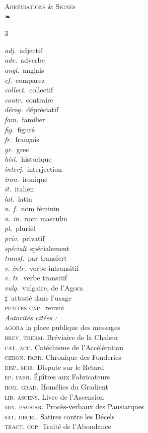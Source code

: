 \documentclass[10pt,twoside]{article}
\newcommand\src[1]{{\scshape\MakeLowercase{#1}}}
\begin{document}
\vspace{5mm}
\begin{center}
{\dispfont\large\scshape Abréviations \& Signes}\\[2pt]
{\color{rubric}❧}
\end{center}
\vspace{1mm}
\begin{multicols}{3}
\footnotesize
\raggedright
\textit{adj.}\ adjectif\\
\textit{adv.}\ adverbe\\
\textit{angl.}\ anglais\\
\textit{cf.}\ comparez\\
\textit{collect.}\ collectif\\
\textit{contr.}\ contraire\\
\textit{dérog.}\ dépréciatif\\
\textit{fam.}\ familier\\
\textit{fig.}\ figuré\\
\textit{fr.}\ français\\
\textit{gr.}\ grec\\
\textit{hist.}\ historique\\
\textit{interj.}\ interjection\\
\textit{iron.}\ ironique\\
\textit{it.}\ italien\\
\textit{lat.}\ latin\\
\textit{n. f.}\ nom féminin\\
\textit{n. m.}\ nom masculin\\
\textit{pl.}\ pluriel\\
\textit{priv.}\ privatif\\
\textit{spécialt}\ spécialement\\
\textit{transf.}\ par transfert\\
\textit{v. intr.}\ verbe intransitif\\
\textit{v. tr.}\ verbe transitif\\
\textit{vulg.}\ vulgaire, de l'Agora\\
\textcolor{rubric}{‡}\ attesté dans l'usage\\
\textsc{petites cap.}\ renvoi\\[4pt]
\textit{Autorités citées :}\\
\src{Agora} la place publique des messages\\
\src{Brev. Therm.} Bréviaire de la Chaleur\\
\src{Cat. Acc.} Catéchisme de l'Accélération\\
\src{Chron. Fabr.} Chronique des Fonderies\\
\src{Disp. Mor.} Dispute sur le Retard\\
\src{Ep. Fabr.} Épîtres aux Fabricateurs\\
\src{Hom. Grad.} Homélies du Gradient\\
\src{Lib. Ascens.} Livre de l'Ascension\\
\src{Min. Pausiar.} Procès-verbaux des Pausiarques\\
\src{Sat. Decel.} Satires contre les Décels\\
\src{Tract. Cop.} Traité de l'Abondance
\end{multicols}
\end{document}
